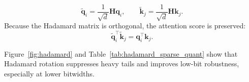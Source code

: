 \documentclass[runningheads]{llncs}
\begin{document}
\begin{equation}
\tilde{\mathbf{q}}_i = \frac{1}{\sqrt{d}}\mathbf{H}\mathbf{q}_i,
\qquad
\tilde{\mathbf{k}}_j = \frac{1}{\sqrt{d}}\mathbf{H}\mathbf{k}_j.
\end{equation}
Because the Hadamard matrix is orthogonal, the attention score is preserved:
\begin{equation}
\tilde{\mathbf{q}}_i^\top \tilde{\mathbf{k}}_j
=
\mathbf{q}_i^\top \mathbf{k}_j.
\end{equation}

Figure~\ref{fig:hadamard} and Table~\ref{tab:hadamard_sparse_quant} show that Hadamard rotation suppresses heavy tails and improves low-bit robustness, especially at lower bitwidths.



\end{document}

